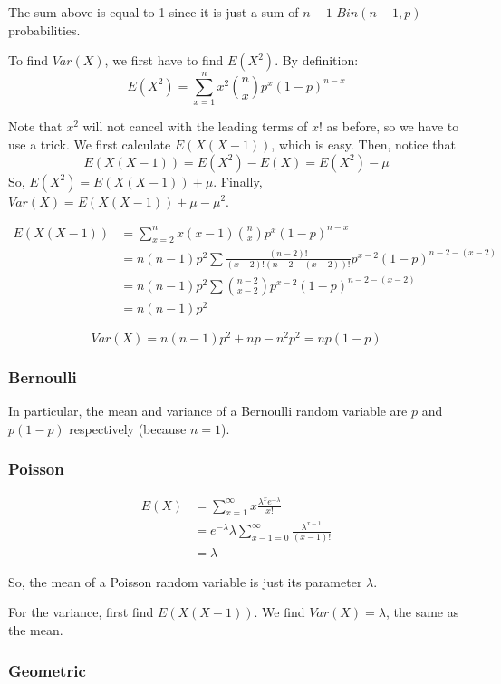 \documentclass[12pt]{article}
\begin{document}
The sum above is equal to 1 since it is just a sum of $n-1$ $Bin(n-1,p)$ probabilities.

To find $Var(X)$, we first have to find $E(X^2)$. By definition:
\[
    E(X^2) = \sum_{x=1}^{n} x^2 {n \choose x} p^x (1-p)^{n-x}
\]

Note that $x^2$ will not cancel with the leading terms of $x!$ as before, so we have to use a trick. We first calculate $E(X(X-1))$, which is easy. Then, notice that
\[
    E(X (X-1)) = E(X^2) - E(X) = E(X^2) - \mu
\]
So, $E(X^2) = E(X(X-1)) + \mu$. Finally, $Var(X) = E(X(X-1)) + \mu - \mu^2$.

\begin{align*}
    E(X(X-1)) &= \sum_{x=2}^{n} x (x-1) {n \choose x} p^x (1-p)^{n-x} \\
        &= n (n-1) p^2 \sum \frac{(n-2)!}{(x-2)! (n-2-(x-2))!} p^{x-2} (1-p)^{n-2-(x-2)} \\
        &= n (n-1) p^2 \sum {{n-2} \choose {x-2}} p^{x-2} (1-p)^{n-2-(x-2)} \\
        &= n (n-1) p^2
\end{align*}

\[
    Var(X) = n (n-1) p^2 + np - n^2 p^2 = n p (1-p)
\]

\subsubsection{Bernoulli}

In particular, the mean and variance of a Bernoulli random variable are $p$ and $p (1-p)$ respectively (because $n=1$).

\subsubsection{Poisson}

\begin{align*}
    E(X) &= \sum_{x=1}^{\infty} x \frac{\lambda^{x} e^{- \lambda}}{x!} \\
        &= e^{- \lambda} \lambda \sum_{x-1 = 0}^{\infty} \frac{\lambda^{x-1}}{(x-1)!} \\
        &= \lambda
\end{align*}

So, the mean of a Poisson random variable is just its parameter $\lambda$.

For the variance, first find $E(X(X-1))$. We find $Var(X) = \lambda$, the same as the mean.

\subsubsection{Geometric}
\end{document}
